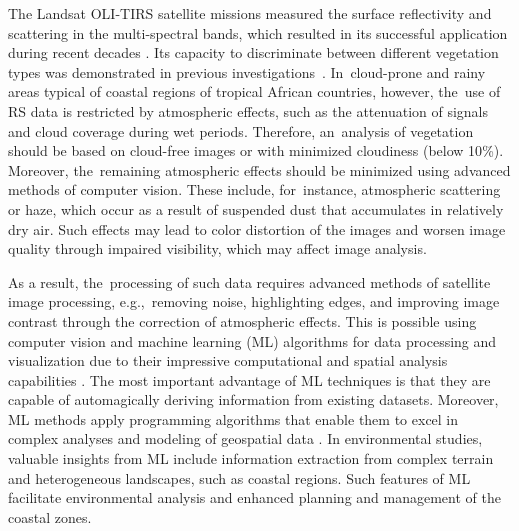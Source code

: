 \documentclass[coasts,article,accept,pdftex,oneauthor]{Definitions/mdpi}
\begin{document}
The Landsat OLI-TIRS satellite missions {measured the} surface reflectivity and {scattering} in the {multi-spectral} bands{,} {which {resulted} in its successful application during {recent} decades} \cite{WULDER2022113195}. Its {capacity} to discriminate between different vegetation types {was} demonstrated in previous investigations~\cite{Ferreira,Montfort,Fatoyinbo,Ribeiro}. In~cloud-prone and rainy areas typical {of} coastal regions of tropical African countries, however, the~use of RS data is restricted by {atmospheric} effects{,} such as the attenuation of signals and cloud coverage during wet {periods}. {Therefore, an~analysis of vegetation should be based on cloud-free images or with {minimized} cloudiness (below 10}\%). {Moreover, the~remaining atmospheric effects should be {minimized} using advanced methods of computer vision. These include, for~instance, {atmospheric} scattering or haze{,} which occur as a result of{ }suspended dust {that accumulates} in relatively dry air. Such effects may lead to {color} distortion {of} the images and worsen image quality through impaired visibility{,} which may affect image analysis. }

As a result, the~processing of such data{ }requires advanced methods of satellite image processing{, e.g.,~removing noise, highlighting edges, {and} improving image contrast through the correction of atmospheric effects. This is possible using} {computer vision} and {machine learning} {(ML)} {algorithms} for data processing and visualization {due to {their} impressive computational and spatial analysis capabilities }\cite{LI2023104653,PHAM2023104501,HAN202387}. {The most {important} advantage of ML techniques is that {they are} capable of {automagically} deriving information from{ }existing datasets. Moreover, ML methods apply programming algorithms {that enable them} to excel in complex analyses and {modeling} of geospatial data} \cite{KHAN2022101678}. {In{ }environmental studies, valuable insights {from} ML {include} information extraction from complex terrain and {heterogeneous} landscapes{,} such as coastal regions. Such features of ML facilitate environmental analysis and {enhanced} planning and management of the coastal zones.}
\end{document}
